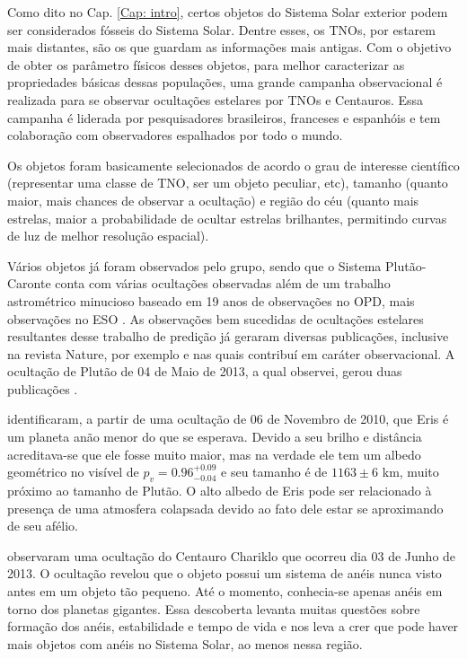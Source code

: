 \documentclass[12pt,a4paper]{monografia}
\begin{document}
\indent \indent Como dito no Cap. \ref{Cap: intro}, certos objetos do Sistema Solar exterior podem ser considerados fósseis do Sistema Solar. Dentre esses, os TNOs, por estarem mais distantes, são os que guardam as informações mais antigas. Com o objetivo de obter os parâmetro físicos desses objetos, para melhor caracterizar as propriedades básicas dessas populações, uma grande campanha observacional é realizada para se observar ocultações estelares por TNOs e Centauros. Essa campanha é liderada por pesquisadores brasileiros, franceses e espanhóis e tem colaboração com observadores espalhados por todo o mundo.

Os objetos foram basicamente selecionados de acordo o grau de interesse científico (representar uma classe de TNO, ser um  objeto peculiar, etc), tamanho (quanto maior, mais chances de observar a ocultação) e região do céu (quanto mais estrelas, maior  a probabilidade de ocultar estrelas brilhantes, permitindo curvas de luz de melhor resolução espacial).

Vários objetos já foram observados pelo grupo, sendo que o Sistema Plutão-Caronte conta com várias ocultações observadas além de um trabalho astrométrico minucioso baseado em 19 anos de observações no OPD, mais observações no ESO \citep{Rossi2014}. As observações bem sucedidas de ocultações estelares resultantes desse trabalho de predição já geraram diversas publicações, inclusive na revista Nature, por exemplo \cite{Sicardy2011} e \cite{BragaRibas2014} nas quais contribuí em caráter observacional. A ocultação de Plutão de 04 de Maio de 2013, a qual observei, gerou duas publicações \citep{Olkin2015, DiasOliveira2015}.

\cite{Sicardy2011} identificaram, a partir de uma ocultação de 06 de Novembro de 2010, que Eris é um planeta anão menor do que se esperava. Devido a seu brilho e distância acreditava-se que ele fosse muito maior, mas na verdade ele tem um albedo geométrico no visível de $p_v=0.96^{+0.09}_{-0.04}$ e seu tamanho é de $1163 \pm 6$ km, muito próximo ao tamanho de Plutão. O alto albedo de Eris pode ser relacionado à presença de uma atmosfera colapsada devido ao fato dele estar se aproximando de seu afélio.

\cite{BragaRibas2014} observaram uma ocultação do Centauro Chariklo que ocorreu dia 03 de Junho de 2013. O ocultação revelou que o objeto possui um sistema de anéis nunca visto antes em um objeto tão pequeno. Até o momento, conhecia-se apenas anéis em torno dos planetas gigantes. Essa descoberta levanta muitas questões sobre formação dos anéis, estabilidade e tempo de vida e nos leva a crer que pode haver mais objetos com anéis no Sistema Solar, ao menos nessa região.
\end{document}
